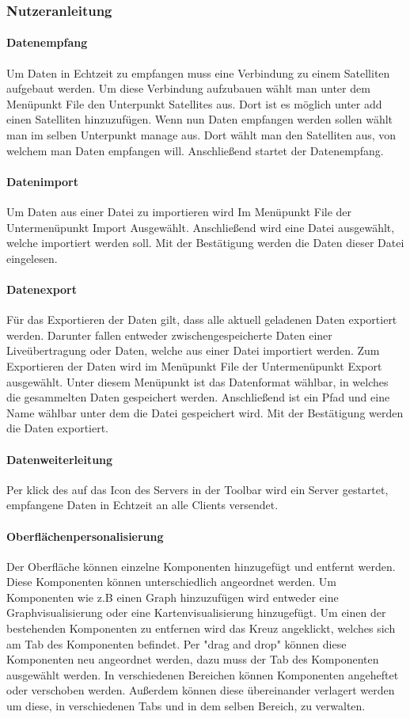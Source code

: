 \subsubsection{Nutzeranleitung}
\paragraph{Datenempfang}
Um Daten in Echtzeit zu empfangen muss eine Verbindung zu einem Satelliten aufgebaut werden. Um diese Verbindung aufzubauen wählt man unter dem Menüpunkt File den Unterpunkt Satellites aus. Dort ist es möglich unter add einen Satelliten hinzuzufügen. Wenn nun Daten empfangen werden sollen wählt man im selben Unterpunkt manage aus. Dort wählt man den Satelliten aus, von welchem man Daten empfangen will. Anschließend startet der Datenempfang.
\paragraph{Datenimport}
Um Daten aus einer Datei zu importieren wird Im Menüpunkt File der Untermenüpunkt Import Ausgewählt. Anschließend wird eine Datei ausgewählt, welche importiert werden soll. Mit der Bestätigung werden die Daten dieser Datei eingelesen.
\paragraph{Datenexport}
Für das Exportieren der Daten gilt, dass alle aktuell geladenen Daten exportiert werden. Darunter fallen entweder zwischengespeicherte Daten einer Liveübertragung oder Daten, welche aus einer Datei importiert werden.
Zum Exportieren der Daten wird im Menüpunkt File der Untermenüpunkt Export ausgewählt. Unter diesem Menüpunkt ist das Datenformat wählbar, in welches die gesammelten Daten gespeichert werden. Anschließend ist ein Pfad und eine Name wählbar unter dem die Datei gespeichert wird. Mit der Bestätigung werden die Daten exportiert.
\paragraph{Datenweiterleitung}
Per klick des auf das Icon des Servers in der Toolbar wird ein Server gestartet, empfangene Daten in Echtzeit an alle Clients versendet.
\paragraph{Oberflächenpersonalisierung}
Der Oberfläche können einzelne Komponenten hinzugefügt und entfernt werden. Diese Komponenten können unterschiedlich angeordnet werden. Um Komponenten wie z.B einen Graph hinzuzufügen wird entweder eine Graphvisualisierung oder eine Kartenvisualisierung hinzugefügt. Um einen der bestehenden Komponenten zu entfernen wird das Kreuz angeklickt, welches sich am Tab des Komponenten befindet. Per "drag and drop" können diese Komponenten neu angeordnet werden, dazu muss der Tab des Komponenten ausgewählt werden. In verschiedenen Bereichen können Komponenten angeheftet oder verschoben werden. Außerdem können diese übereinander verlagert werden um diese, in verschiedenen Tabs und in dem selben Bereich, zu verwalten.

